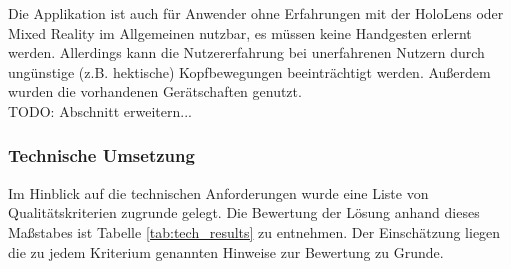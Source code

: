 Die Applikation ist auch für Anwender ohne Erfahrungen mit der HoloLens oder Mixed Reality im Allgemeinen nutzbar, es müssen keine Handgesten erlernt werden. Allerdings kann die Nutzererfahrung bei unerfahrenen Nutzern durch ungünstige (z.B. hektische) Kopfbewegungen beeinträchtigt werden. Außerdem wurden die vorhandenen Gerätschaften genutzt.\\

TODO: Abschnitt erweitern...

\subsubsection{Technische Umsetzung}
Im Hinblick auf die technischen Anforderungen wurde eine Liste von Qualitätskriterien zugrunde gelegt. Die Bewertung der Lösung anhand dieses Maßstabes ist Tabelle \ref{tab:tech_results} zu entnehmen. Der Einschätzung liegen die zu jedem Kriterium genannten Hinweise zur Bewertung zu Grunde.
